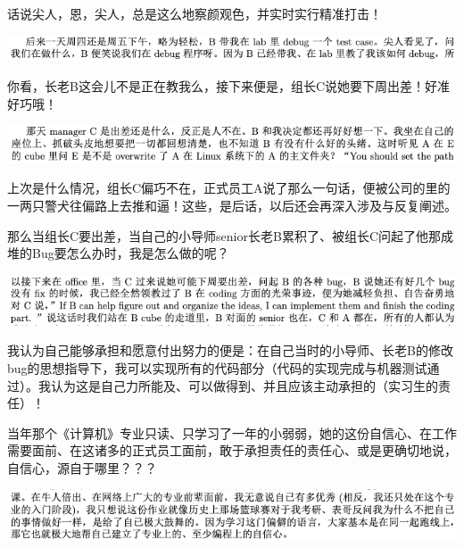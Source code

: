 \documentclass[9pt, b5paper]{article}
\begin{document}
话说尖人，恩，尖人，总是这么地察颜观色，并实时实行精准打击！

\begin{center}
\includegraphics[width=.9\linewidth]{./pic/backups_plans_20210507_105925.png}
\end{center}

你看，长老B这会儿不是正在教我么，接下来便是，组长C说她要下周出差！好准好巧哦！

\begin{center}
\includegraphics[width=.9\linewidth]{./pic/backups_plans_20210507_110205.png}
\end{center}

上次是什么情况，组长C偏巧不在，正式员工A说了那么一句话，便被公司的里的一两只警犬往偏路上去推和逼！这些，是后话，以后还会再深入涉及与反复阐述。



那么当组长C要出差，当自己的小导师senior长老B累积了、被组长C问起了他那成堆的Bug要怎么办时，我是怎么做的呢？

\begin{center}
\includegraphics[width=.9\linewidth]{./pic/backups_plans_20210507_110401.png}
\end{center}

我认为自己能够承担和愿意付出努力的便是：在自己当时的小导师、长老B的修改bug的思想指导下，我可以实现所有的代码部分（代码的实现完成与机器测试通过）。我认为这是自己力所能及、可以做得到、并且应该主动承担的（实习生的责任）！ 

当年那个《计算机》专业只读、只学习了一年的小弱弱，她的这份自信心、在工作需要面前、在这诸多的正式员工面前，敢于承担责任的责任心、或是更确切地说，自信心，源自于哪里？？？

\begin{center}
\includegraphics[width=.9\linewidth]{./pic/backups_plans_20210502_114726.png}
\end{center}
\end{document}
